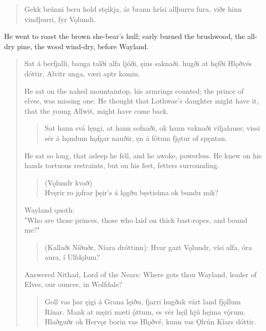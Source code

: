 \begin{verse}
\bva Gekk brúnni \hld beru hold stęikja,
ár brann hrísi \hld allþurru fura,
viðr hinn vindþurri, \hld fyr Vǫlundi. \\%
\end{verse}

\bvb He went to roast the brown she-bear's hull; early burned the brushwood, the all-dry pine, the wood wind-dry, before Wayland.

\begin{verse}
\bva Sat á berfjalli, \hld bauga talði
alfa ljóði, \hld ęins saknaði.
hugði at hęfði \hld Hlǫðvés dóttir,
Alvitr unga, \hld væri aptr komin.
 
\bvb He sat on the naked mountaintop, his armrings counted; the prince of elves, was missing one. He thought that Lothwae's daughter might have it, that the young Allwit, might have come back.

\begin{verse}
\bva Sat hann svá lęngi, \hld at hann sofnaði,
ok hann vaknaði \hld viljalauss;
vissi sér á hǫndum \hld hǫfgar nauðir,
ęn á fótum \hld fjǫtur of spęntan. \\%
\end{verse}

\bvb He sat so long, that asleep he fell, and he awoke, powerless. He knew on his hands tortuous restraints, but on his feet, fetters surrounding.

\begin{verse}
(Vǫlundr kvað) \\
\bva Hvęrir ro jǫfrar \hld þęir's á lǫgðu
bęstisíma \hld ok bundu mik? \\%
\end{verse}

\bvb Wayland quoth: \\
"Who are those princes, those who laid on thick bast-ropes, and bound me?"

\begin{verse}
\bva (Kallaði Níðuðr, \hld Níara dróttinn):
Hvar gazt Vǫlundr, \hld vísi alfa,
óra aura, \hld í Ulfdǫlum? \\%

\end{verse}

\bvb Answered Nithad, Lord of the Nears: Where gots thou Wayland, leader of Elves, our ounces, in Wolfdale?

\begin{verse}
\bva Goll vas þar ęigi \hld á Grana lęiðu,
fjarri hugðak várt land \hld fjǫllum Rínar.
Mank at męiri \hld mæti ǫ́ttum,
es vér hęil hjú \hld hęima vǫ́rum. \\%
Hlaðguðr ok Hervǫr \hld borin vas Hlǫðvé,
kunn vas Ǫlrún \hld Kíars dóttir.  \\%
\end{verse}


\end{verse}
